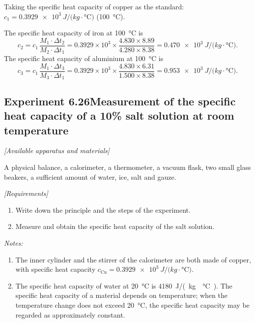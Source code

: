 \noindent Taking the specific heat capacity of copper as the standard: $c_1=\SI{0.3929e3}{J/(kg\cdot\celsius)}$ (\SI{100}{\celsius}).

The specific heat capacity of iron at \SI{100}{\celsius} is
\begin{equation*}
c_2=c_1\,\frac{M_1\cdot\Delta t_2}{M_2\cdot\Delta t_1}
=0.3929\times10^{3}\times\frac{4.830\times8.89}{4.280\times8.38}
=\SI{0.470e3}{J/(kg\cdot\celsius)}.
\end{equation*}
The specific heat capacity of aluminium at \SI{100}{\celsius} is
\begin{equation*}
c_3=c_1\,\frac{M_1\cdot\Delta t_3}{M_3\cdot\Delta t_1}
=0.3929\times10^{3}\times\frac{4.830\times6.31}{1.500\times8.38}
=\SI{0.953e3}{J/(kg\cdot\celsius)}.
\end{equation*}

\subsection*{Experiment 6.26\quad Measurement of the specific heat capacity of a 10\% salt solution at room temperature}

\noindent\textit{[Available apparatus and materials]}

A physical balance, a calorimeter, a thermometer, a vacuum flask, two small glass beakers, a sufficient amount of water, ice, salt and gauze.

\noindent\textit{[Requirements]}
\begin{enumerate}[label=(\arabic*),leftmargin=2.2em,itemsep=1pt,topsep=2pt]
\item Write down the principle and the steps of the experiment.
\item Measure and obtain the specific heat capacity of the salt solution.
\end{enumerate}

\noindent\textit{Notes:}
\begin{enumerate}[label=(\arabic*),leftmargin=2.2em,itemsep=1pt,topsep=2pt]
\item The inner cylinder and the stirrer of the calorimeter are both made of copper, with specific heat capacity $c_{\mathrm{Cu}}=\SI{0.3929e3}{J/(kg\cdot\celsius)}$.
\item The specific heat capacity of water at \SI{20}{\celsius} is \SI{4180}{J/(kg\cdot\celsius)}. The specific heat capacity of a material depends on temperature; when the temperature change does not exceed \SI{20}{\celsius}, the specific heat capacity may be regarded as approximately constant.
\end{enumerate}


